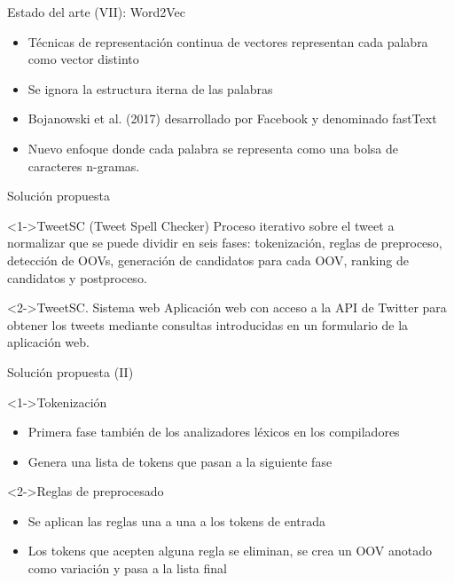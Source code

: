\begin{tframe}{Estado del arte (VII): Word2Vec}
	\begin{itemize}
		\item T\'ecnicas de representaci\'on continua de vectores representan cada palabra como vector distinto
		\item<+-> Se ignora la estructura iterna de las palabras 
		\item<+-| alert@+> Bojanowski et al. (2017) desarrollado por Facebook y denominado fastText
		\item<+-| alert@+> Nuevo enfoque donde cada palabra se representa como una bolsa de caracteres n-gramas.
	\end{itemize}
\end{tframe}

\begin{tframe}{Soluci\'on propuesta}
	\begin{block}<1->{TweetSC (Tweet Spell Checker)}
		Proceso iterativo sobre el tweet a normalizar que se puede dividir en seis fases: tokenizaci\'on, reglas de preproceso, detecci\'on de OOVs, generaci\'on de candidatos para cada OOV, ranking de candidatos y postproceso.
	\end{block}
	\begin{block}<2->{TweetSC. Sistema web}
		Aplicaci\'on web con acceso a la API de Twitter para obtener los tweets mediante consultas introducidas en un formulario de la aplicaci\'on web.
	\end{block}
\end{tframe}

\begin{tframe}{Soluci\'on propuesta (II)}
	\begin{block}<1->{Tokenizaci\'on}
		\begin{itemize}
			\item Primera fase tambi\'en de los analizadores l\'exicos en los compiladores
			\item Genera una lista de tokens que pasan a la siguiente fase
		\end{itemize}
	\end{block}
	\begin{block}<2->{Reglas de preprocesado}
		\begin{itemize}
			\item Se aplican las reglas una a una a los tokens de entrada
			\item Los tokens que acepten alguna regla se eliminan, se crea un OOV anotado como variaci\'on y pasa a la lista final
		\end{itemize}
	\end{block}
	
\end{tframe}

